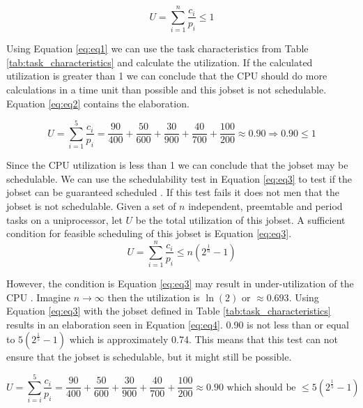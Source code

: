 \documentclass[10pt]{article}
\begin{document}
\begin{equation}
    U = \sum_{i=1}^{n} \frac{c_i}{p_i} \leq 1
    \label{eq:eq1}
\end{equation}

Using Equation \ref{eq:eq1} we can use the task characteristics from Table \ref{tab:task_characteristics} and calculate the utilization. If the calculated utilization is greater than 1 we can conclude that the CPU should do more calculations in a time unit than possible and this jobset is not schedulable.
Equation \ref{eq:eq2} contains the elaboration.

\begin{equation}
    U = \sum_{i=1}^{5} \frac{c_i}{p_i} = \frac{90}{400} + \frac{50}{600} + \frac{30}{900} + \frac{40}{700} + \frac{100}{200} \approx 0.90 \Rightarrow 0.90 \leq 1
    \label{eq:eq2}
\end{equation}

Since the CPU utilization is less than 1 we can conclude that the jobset may be schedulable.
We can use the schedulability test in Equation \ref{eq:eq3} to test if the jobset can be guaranteed scheduled \cite{ucosii} \cite{rtos}.
If this test fails it does not men that the jobset is not schedulable.
Given a set of $n$ independent, preemtable and period tasks on a uniprocessor, let $U$ be the total utilization of this jobset.
A sufficient condition for feasible scheduling of this jobset is Equation \ref{eq:eq3}.
\begin{equation}
    U = \sum_{i=1}^{n} \frac{c_i}{p_i} \leq n(2^{\frac{1}{n}} - 1)
    \label{eq:eq3}
\end{equation}

However, the condition is Equation \ref{eq:eq3} may result in under-utilization of the CPU \cite{cheng}.
Imagine $n \rightarrow \infty$ then the utilization is $ \ln(2)$ or $\approx0.693$.
Using Equation \ref{eq:eq3} with the jobset defined in Table \ref{tab:task_characteristics} results in an elaboration seen in Equation \ref{eq:eq4}.
0.90 is not less than or equal to $5(2^{\frac{1}{5}} - 1)$ which is approximately 0.74.
This means that this test can not ensure that the jobset is schedulable, but it might still be possible.

\begin{equation}
    U = \sum_{i=i}^{5} \frac{c_i}{p_i} = \frac{90}{400} + \frac{50}{600} + \frac{30}{900} + \frac{40}{700} + \frac{100}{200} \approx 0.90 \text{  which should be } \leq  5(2^{\frac{1}{5}} - 1)  
    \label{eq:eq4}
\end{equation}
\end{document}
